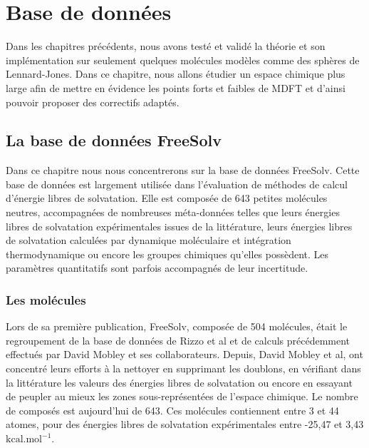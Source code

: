 \chapter{Base de données}
\label{chap:BDD}



Dans les chapitres précédents, nous avons testé et validé la théorie et son implémentation sur seulement quelques molécules modèles comme des sphères de Lennard-Jones. Dans ce chapitre, nous allons étudier un espace chimique plus large afin de mettre en évidence les points forts et faibles de MDFT et d'ainsi pouvoir proposer des correctifs adaptés.



\section{La base de données FreeSolv}
Dans ce chapitre nous nous concentrerons sur la base de données FreeSolv\cite{Mobley_small_2009}. Cette base de données est largement utilisée dans l'évaluation de méthodes de calcul d'énergie libres de solvatation. Elle est composée de 643 petites molécules neutres, accompagnées de nombreuses méta-données telles que leurs énergies libres de solvatation expérimentales issues de la littérature, leurs énergies libres de solvatation calculées par dynamique moléculaire et intégration thermodynamique ou encore les groupes chimiques qu'elles possèdent. Les paramètres quantitatifs sont parfois accompagnés de leur incertitude.

\subsection{Les molécules}
Lors de sa première publication, FreeSolv, composée de 504 molécules, était le regroupement de la base de données de Rizzo et al\cite{Rizzo_estimation_2006} et de calculs précédemment effectués par David Mobley et ses collaborateurs. Depuis, David Mobley et al, ont concentré leurs efforts à la nettoyer\cite{Mobley_small_2009, Mobley_treating_2008, Mobley_comparison_2007, Mobley_predictions_2009, Beckstein_prediction_2011, Mobley_alchemical_2011, Mobley_blind_2014, Mobley_freesolv_2014, DuarteRamosMatos_approaches_2017} en supprimant les doublons, en vérifiant dans la littérature les valeurs des énergies libres de solvatation ou encore en essayant de peupler au mieux les zones sous-représentées de l'espace chimique. Le nombre de composés est aujourd'hui de 643. Ces molécules contiennent entre 3 et 44 atomes, pour des énergies libres de solvatation expérimentales entre -25,47 et 3,43 $\mathrm{kcal}.\mathrm{mol}^{-1}$. 

